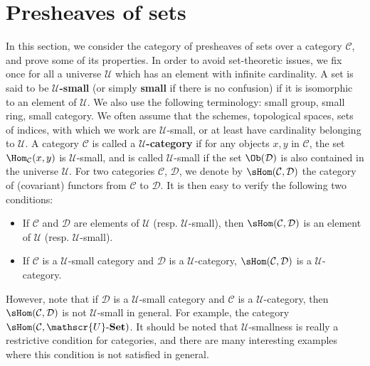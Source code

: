 \section{Presheaves of sets}\label{category presheaf section}
In this section, we consider the category of presheaves of sets over a category $\mathcal{C}$, and prove some of its properties. In order to avoid set-theoretic issues, we fix once for all a universe $\mathscr{U}$ which has an element with infinite cardinality. A set is said to be \textbf{$\mathscr{U}$-small} (or simply \textbf{small} if there is no confusion) if it is isomorphic to an element of $\mathscr{U}$. We also use the following terminology: small group, small ring, small category. We often assume that the schemes, topological spaces, sets of indices, with which we work are $\mathscr{U}$-small, or at least have cardinality belonging to $\mathscr{U}$. A category $\mathcal{C}$ is called a \textbf{$\mathscr{U}$-category} if for any objects $x,y$ in $\mathcal{C}$, the set $\Hom_\mathcal{C}(x,y)$ is $\mathscr{U}$-small, and is called $\mathscr{U}$-small if the set $\Ob(\mathcal{D})$ is also contained in the universe $\mathscr{U}$. For two categories $\mathcal{C}$, $\mathcal{D}$, we denote by $\sHom(\mathcal{C},\mathcal{D})$ the category of (covariant) functors from $\mathcal{C}$ to $\mathcal{D}$. It is then easy to verify the following two conditions:
\begin{itemize}
\item If $\mathcal{C}$ and $\mathcal{D}$ are elements of $\mathscr{U}$ (resp. $\mathscr{U}$-small), then $\sHom(\mathcal{C},\mathcal{D})$ is an element of $\mathscr{U}$ (resp. $\mathscr{U}$-small).
\item If $\mathcal{C}$ is a $\mathscr{U}$-small category and $\mathcal{D}$ is a $\mathscr{U}$-category, $\sHom(\mathcal{C},\mathcal{D})$ is a $\mathscr{U}$-category.
\end{itemize}
However, note that if $\mathcal{D}$ is a $\mathscr{U}$-small category and $\mathcal{C}$ is a $\mathscr{U}$-category, then $\sHom(\mathcal{C},\mathcal{D})$ is not $\mathscr{U}$-small in general. For example, the category $\sHom(\mathcal{C},\mathscr{U}\text{-}\mathbf{Set})$. It should be noted that $\mathscr{U}$-smallness is really a restrictive condition for categories, and there are many interesting examples where this condition is not satisfied in general.
